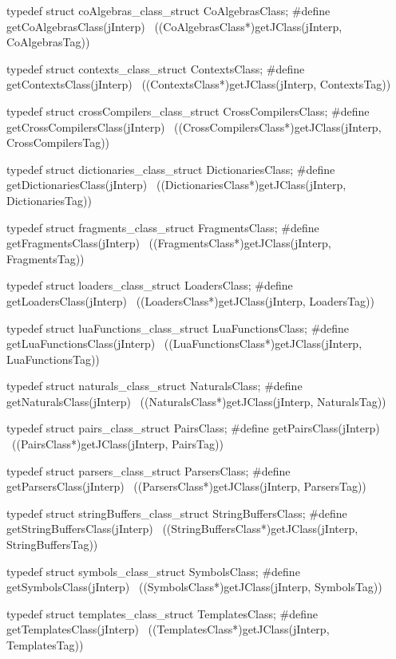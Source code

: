 typedef struct coAlgebras_class_struct CoAlgebrasClass;
#define getCoAlgebrasClass(jInterp)                         \
  ((CoAlgebrasClass*)getJClass(jInterp, CoAlgebrasTag))

typedef struct contexts_class_struct ContextsClass;
#define getContextsClass(jInterp)                           \
  ((ContextsClass*)getJClass(jInterp, ContextsTag))

typedef struct crossCompilers_class_struct CrossCompilersClass;
#define getCrossCompilersClass(jInterp)                     \
  ((CrossCompilersClass*)getJClass(jInterp, CrossCompilersTag))

typedef struct dictionaries_class_struct DictionariesClass;
#define getDictionariesClass(jInterp)                       \
  ((DictionariesClass*)getJClass(jInterp, DictionariesTag))

typedef struct fragments_class_struct FragmentsClass;
#define getFragmentsClass(jInterp)                          \
  ((FragmentsClass*)getJClass(jInterp, FragmentsTag))

typedef struct loaders_class_struct LoadersClass;
#define getLoadersClass(jInterp)                            \
  ((LoadersClass*)getJClass(jInterp, LoadersTag))

typedef struct luaFunctions_class_struct LuaFunctionsClass;
#define getLuaFunctionsClass(jInterp)                       \
  ((LuaFunctionsClass*)getJClass(jInterp, LuaFunctionsTag))

typedef struct naturals_class_struct NaturalsClass;
#define getNaturalsClass(jInterp)                           \
  ((NaturalsClass*)getJClass(jInterp, NaturalsTag))

typedef struct pairs_class_struct PairsClass;
#define getPairsClass(jInterp)                              \
  ((PairsClass*)getJClass(jInterp, PairsTag))

typedef struct parsers_class_struct ParsersClass;
#define getParsersClass(jInterp)                            \
  ((ParsersClass*)getJClass(jInterp, ParsersTag))

typedef struct stringBuffers_class_struct StringBuffersClass;
#define getStringBuffersClass(jInterp)                      \
  ((StringBuffersClass*)getJClass(jInterp, StringBuffersTag))

typedef struct symbols_class_struct SymbolsClass;
#define getSymbolsClass(jInterp)                            \
  ((SymbolsClass*)getJClass(jInterp, SymbolsTag))
  
typedef struct templates_class_struct TemplatesClass;
#define getTemplatesClass(jInterp)                          \
  ((TemplatesClass*)getJClass(jInterp, TemplatesTag))

